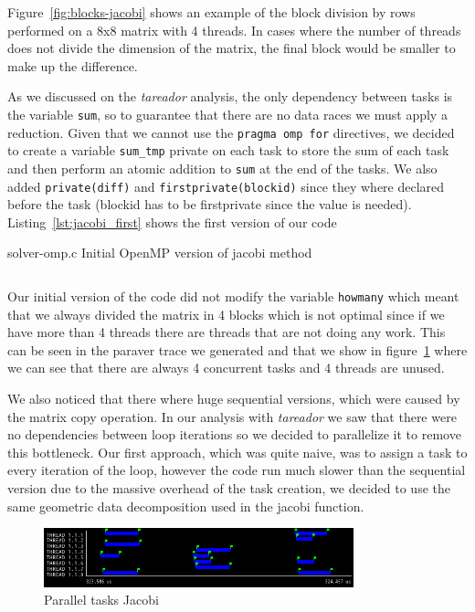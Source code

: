 Figure~\ref{fig:blocks-jacobi} shows an example of the block division by rows performed on a 8x8 matrix
with 4 threads. In cases where the number of threads does not divide the dimension of the matrix, the final
block would be smaller to make up the difference.

As we discussed on the \emph{tareador} analysis, the only dependency between tasks is the variable
\texttt{sum}, so to guarantee that there are no data races we must apply a reduction. Given that we cannot use
the \texttt{pragma omp for} directives, we decided to create a variable \texttt{sum\_tmp} private on each
task to store the sum of each task and then perform an atomic addition to \texttt{sum} at the end of the tasks.
We also added \texttt{private(diff)} and \texttt{firstprivate(blockid)} since they where declared before the
task (blockid has to be firstprivate since the value is needed).
Listing~\ref{lst:jacobi_first} shows the first version of our code 

\begin{listing}[H]
    \caption{solver-omp.c Initial OpenMP version of jacobi method}%
    \label{lst:jacobi_first}
    \inputminted[firstline=26,lastline=55]{c}{code/solver-omp-jacobi-v1.c}
\end{listing}

Our initial version of the code did not modify the variable \texttt{howmany} which meant that we always
divided the matrix in 4 blocks which is not optimal since if we have more than 4 threads there are threads
that are not doing any work. This can be seen in the paraver trace we generated and that we show in
figure~\ref{fig:trace-jacobi0} where we can see that there are always 4 concurrent tasks and 4 threads are unused.

We also noticed that there where huge sequential versions, which were caused by the matrix copy operation.
In our analysis with \emph{tareador} we saw that there were no dependencies between loop iterations so
we decided to parallelize it to remove this bottleneck. Our first approach, which was quite naive, was to
assign a task to every iteration of the loop, however the code run much slower than the sequential
version due to the massive overhead of the task creation, we decided to use the same geometric data
decomposition used in the jacobi function.

\begin{figure}[H]
    \centering
    \includegraphics[width=0.8\textwidth]{jacobi_0_tasks}
    \caption{Parallel tasks Jacobi}%
    \label{fig:trace-jacobi0}
\end{figure}

